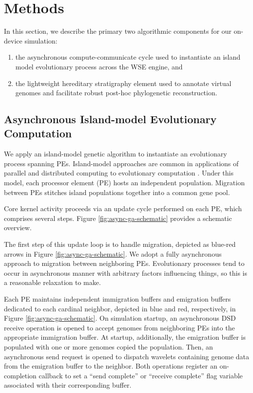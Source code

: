 \section{Methods} \label{sec:methods}

In this section, we describe the primary two algorithmic components for our on-device simulation:
\begin{enumerate}
\item the asynchronous compute-communicate cycle used to instantiate an island model evolutionary process across the WSE engine, and
\item the lightweight hereditary stratigraphy element used to annotate virtual genomes and facilitate robust post-hoc phylogenetic reconstruction.
\end{enumerate}

\subsection{Asynchronous Island-model Evolutionary Computation}


We apply an island-model genetic algorithm to instantiate an evolutionary process spanning PEs.
Island-model approaches are common in applications of parallel and distributed computing to evolutionary computation \citep{bennett1999building}.
Under this model, each processor element (PE) hosts an independent population.
Migration between PEs stitches island populations together into a common gene pool.

Core kernel activity proceeds via an update cycle performed on each PE, which comprises several steps.
Figure \ref{fig:async-ga-schematic} provides a schematic overview.

The first step of this update loop is to handle migration, depicted as blue-red arrows in Figure \ref{fig:async-ga-schematic}.
We adopt a fully asynchronous approach to migration between neighboring PEs.
Evolutionary processes tend to occur in asynchronous manner with arbitrary factors influencing things, so this is a reasonable relaxation to make.

Each PE maintains independent immigration buffers and emigration buffers dedicated to each cardinal neighbor, depicted in blue and red, respectively, in Figure \ref{fig:async-ga-schematic}.
On simulation startup, an asynchronous DSD receive operation is opened to accept genomes from neighboring PEs into the appropriate immigration buffer.
At startup, additionally, the emigration buffer is populated with one or more genomes copied the population.
Then, an asynchronous send request is opened to dispatch wavelets containing genome data from the emigration buffer to the neighbor.
Both operations register an on-completion callback to set a ``send complete'' or ``receive complete'' flag variable associated with their corresponding buffer.

